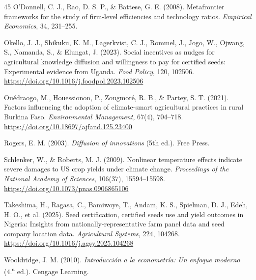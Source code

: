 \documentclass[11pt,a4paper,twocolumn]{article}
\begin{document}
\begin{thebibliography}{45}
O'Donnell, C. J., Rao, D. S. P., \& Battese, G. E. (2008). Metafrontier frameworks for the study of firm-level efficiencies and technology ratios. \textit{Empirical Economics}, 34, 231--255.

Okello, J. J., Shikuku, K. M., Lagerkvist, C. J., Rommel, J., Jogo, W., Ojwang, S., Namanda, S., \& Elungat, J. (2023). Social incentives as nudges for agricultural knowledge diffusion and willingness to pay for certified seeds: Experimental evidence from Uganda. \textit{Food Policy}, 120, 102506. \url{https://doi.org/10.1016/j.foodpol.2023.102506}

Ouédraogo, M., Houessionon, P., Zougmoré, R. B., \& Partey, S. T. (2021). Factors influencing the adoption of climate-smart agricultural practices in rural Burkina Faso. \textit{Environmental Management}, 67(4), 704--718. \url{https://doi.org/10.18697/ajfand.125.23400}

Rogers, E. M. (2003). \textit{Diffusion of innovations} (5th ed.). Free Press.

Schlenker, W., \& Roberts, M. J. (2009). Nonlinear temperature effects indicate severe damages to US crop yields under climate change. \textit{Proceedings of the National Academy of Sciences}, 106(37), 15594--15598. \url{https://doi.org/10.1073/pnas.0906865106}

Takeshima, H., Ragasa, C., Bamiwoye, T., Andam, K. S., Spielman, D. J., Edeh, H. O., et al. (2025). Seed certification, certified seeds use and yield outcomes in Nigeria: Insights from nationally-representative farm panel data and seed company location data. \textit{Agricultural Systems}, 224, 104268. \url{https://doi.org/10.1016/j.agsy.2025.104268}

Wooldridge, J. M. (2010). \textit{Introducción a la econometría: Un enfoque moderno} (4.\textsuperscript{a} ed.). Cengage Learning.

\end{thebibliography}
\end{document}
